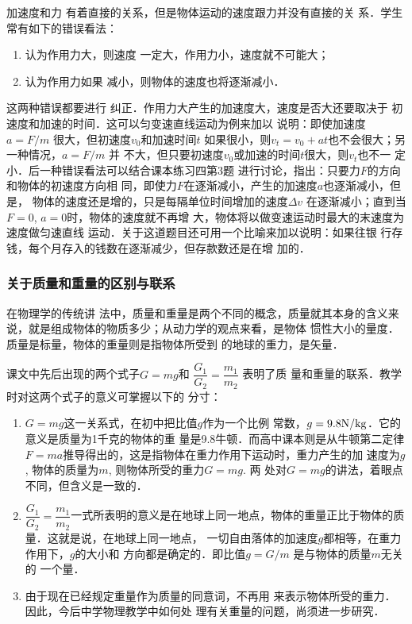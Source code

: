 加速度和力
有着直接的关系，但是物体运动的速度跟力并没有直接的关
系．学生常有如下的错误看法：
\begin{enumerate}
    \item 认为作用力大，则速度
一定大，作用力小，速度就不可能大；
\item 认为作用力如果
减小，则物体的速度也将逐渐减小．
\end{enumerate}
这两种错误都要进行
纠正．作用力大产生的加速度大，速度是否大还要取决于
初速度和加速的时间．这可以匀变速直线运动为例来加以
说明：即使加速度$a=F/m$
很大，但初速度$v_0$和加速时间$t$
如果很小，则$v_t=v_0+at$也不会很大；另一种情况，$a=F/m$
并
不大，但只要初速度$v_0$或加速的时间$t$很大，则$v_t$也不一
定小．后一种错误看法可以结合课本练习四第3题
进行讨论，指出：只要力$F$的方向和物体的初速度方向相
同，即使力$F$在逐渐减小，产生的加速度$a$也逐渐减小，但是，
物体的速度还是增的，只是每隔单位时间增加的速度$\Delta v$
在逐渐减小；直到当$F=0$, $a=0$时，物体的速度就不再增
大，物体将以做变速运动时最大的末速度为速度做匀速直线
运动．关于这道题目还可用一个比喻来加以说明：如果往银
行存钱，每个月存入的钱数在逐渐减少，但存款数还是在增
加的．

\subsubsection{关于质量和重量的区别与联系}

在物理学的传统讲
法中，质量和重量是两个不同的概念，质量就其本身的含义来
说，就是组成物体的物质多少；从动力学的观点来看，是物体
惯性大小的量度．质量是标量，物体的重量则是指物体所受到
的地球的重力，是矢量．

课文中先后出现的两个式子$G=mg$和
$\dfrac{G_1}{G_2}=\dfrac{m_1}{m_2}$
表明了质
量和重量的联系．教学时对这两个式子的意义可掌握以下的
分寸：
\begin{enumerate}
    \item $G=mg$这一关系式，在初中把比值$g$作为一个比例
常数，$g=9.8{\rm N/kg}$．它的意义是质量为1千克的物体的重
量是9.8牛顿．而高中课本则是从牛顿第二定律$F=ma$推导得出的，这是指物体在重力作用下运动时，重力产生的加
速度为$g$, 物体的质量为$m$, 则物体所受的重力$G=mg$. 两
处对$G=mg$的讲法，着眼点不同，但含义是一致的．

\item $\dfrac{G_1}{G_2}=\dfrac{m_1}{m_2}$一式所表明的意义是在地球上同一地点，物体的重量正比于物体的质量．这就是说，在地球上同一地点，
一切自由落体的加速度$g$都相等，在重力作用下，$g$的大小和
方向都是确定的．即比值$g=G/m$
是与物体的质量$m$无关的
一个量．

\item 由于现在已经规定重量作为质量的同意词，不再用
来表示物体所受的重力．因此，今后中学物理教学中如何处
理有关重量的问题，尚须进一步研究．
\end{enumerate}

